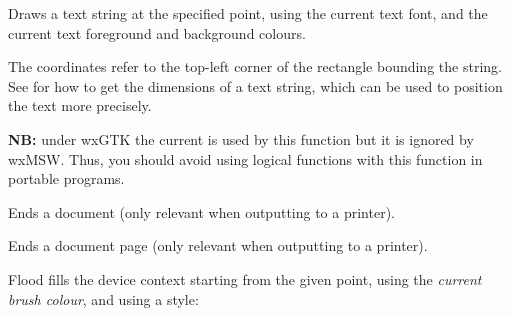 
Draws a text string at the specified point, using the current text font,
and the current text foreground and background colours.

The coordinates refer to the top-left corner of the rectangle bounding
the string. See  for how
to get the dimensions of a text string, which can be used to position the
text more precisely.

{\bf NB:} under wxGTK the current 
 is used by this function
but it is ignored by wxMSW. Thus, you should avoid using logical functions
with this function in portable programs.

\begin{comment}

\membersection{wxDC::EnableCache}\label{wxdcenablecache}

\func{static void}{EnableCache}{\param{bool}{ enableCache}}

On supported platforms (currently only Windows), enables the DC cache
which can speed up the \helpref{Blit}{wxdcblit} operation when
drawing a large number of masked bitmaps.

If using the cache functions in your code, please test for the
wxUSE\_DC\_CACHEING preprocessor symbol for portability.

\wxheading{See also}

\helpref{wxDC::CacheEnabled}{wxdccacheenabled}, \helpref{wxDC::ClearCache}
\end{comment}


\label{wxdcenddoc}


Ends a document (only relevant when outputting to a printer).


\label{wxdcendpage}


Ends a document page (only relevant when outputting to a printer).


\label{wxdcfloodfill}


Flood fills the device context starting from the given point, using
the {\it current brush colour}, and using a style:


